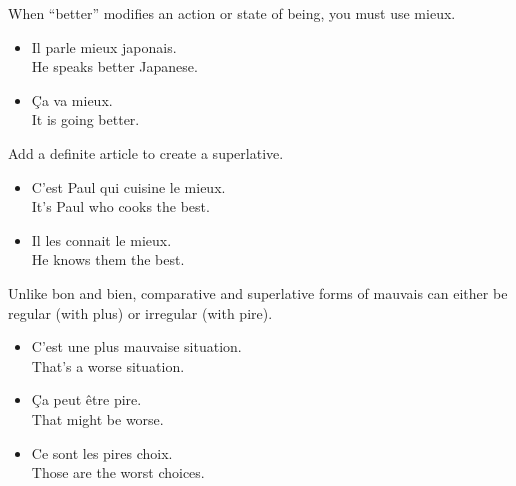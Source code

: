 When ``better'' modifies an action or state of being, you must use mieux.

\begin{itemize}
  \item  Il parle mieux japonais. \\ He speaks better Japanese.
  \item  {\c C}a va mieux. \\ It is going better.
\end{itemize}

Add a definite article to create a superlative.

\begin{itemize}
  \item  C'est Paul qui cuisine le mieux. \\ It's Paul who cooks the best.
  \item  Il les connait le mieux. \\ He knows them the best.
\end{itemize}

Unlike bon and bien, comparative and superlative forms of mauvais can either be regular (with plus) or irregular (with pire).

\begin{itemize}
  \item  C'est une plus mauvaise situation. \\ That's a worse situation.
  \item  {\c C}a peut être pire. \\ That might be worse.
  \item  Ce sont les pires choix. \\ Those are the worst choices.
\end{itemize}

